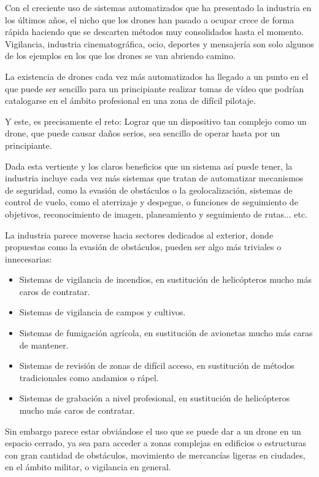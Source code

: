

Con el creciente uso de sistemas automatizados que ha presentado la industria en los últimos años, el nicho que los drones han pasado a ocupar crece de forma rápida haciendo que se descarten métodos muy consolidados hasta el momento. 
Vigilancia, industria cinematográfica, ocio, deportes y mensajería son solo algunos de los ejemplos en los que los drones se van abriendo camino. 

La existencia de drones cada vez más automatizados ha llegado a un punto en el que puede ser sencillo para un principiante realizar tomas de vídeo que podrían catalogarse en el ámbito profesional en una zona de difícil pilotaje.

Y este, es precisamente el reto: Lograr que un dispositivo tan complejo como un drone, que puede causar daños serios, sea sencillo de operar hasta por un principiante. 

Dada esta vertiente y los claros beneficios que un sistema así puede tener, la industria incluye cada vez más sistemas que tratan de automatizar mecanismos de seguridad, como la evasión de obstáculos o la geolocalización, sistemas de control de vuelo, como el aterrizaje y despegue, o funciones de seguimiento de objetivos, reconocimiento de imagen, planeamiento y seguimiento de rutas... etc. 

La industria parece moverse hacia sectores dedicados al exterior, donde propuestas como la evasión de obstáculos, pueden ser algo más triviales o innecesarias:

\begin{itemize}
\item Sistemas de vigilancia de incendios, en sustitución de helicópteros mucho más caros de contratar.
\item Sistemas de vigilancia de campos y cultivos.
\item Sistemas de fumigación agrícola, en sustitución de avionetas mucho más caras de mantener.
\item Sistemas de revisión de zonas de difícil acceso, en sustitución de métodos tradicionales como andamios o rápel.
\item Sistemas de grabación a nivel profesional, en sustitución de helicópteros mucho más caros de contratar.
\end{itemize}

Sin embargo parece estar obviándose el uso que se puede dar a un drone en un espacio cerrado, ya sea para acceder a zonas complejas en edificios o estructuras con gran cantidad de obstáculos, movimiento de mercancías ligeras en ciudades, en el ámbito militar, o vigilancia en general.

